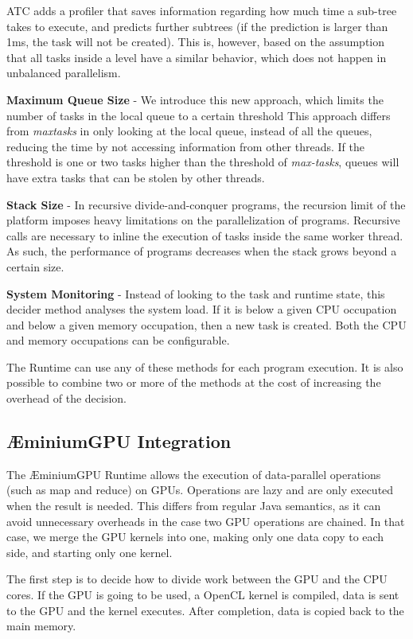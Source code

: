 \documentclass[smallextended]{svjour3}
\begin{document}
ATC adds a profiler that saves information regarding how much time a sub-tree takes to execute, and predicts further subtrees (if the prediction is larger than 1ms, the task will not be created). This is, however, based on the assumption that all tasks inside a level have a similar behavior, which does not happen in unbalanced parallelism.

\textbf{Maximum Queue Size} - We introduce this new approach, which limits the number of tasks in the local queue to a certain threshold This approach differs from \emph{maxtasks} in only looking at the local queue, instead of all the queues, reducing the time by not accessing information from other threads. If the threshold is one or two tasks higher than the threshold of \emph{max-tasks}, queues will have extra tasks that can be stolen by other threads.

\textbf{Stack Size} - In recursive divide-and-conquer programs, the recursion limit of the platform imposes heavy limitations on the parallelization of programs. Recursive calls are necessary to inline the execution of tasks inside the same worker thread. As such, the performance of programs decreases when the stack grows beyond a certain size.

\textbf{System Monitoring} - Instead of looking to the task and runtime state, this decider method analyses the system load. If it is below a given CPU occupation and below a given memory occupation, then a new task is created. Both the CPU and memory occupations can be configurable.


The Runtime can use any of these methods for each program execution. It is also possible to combine two or more of the methods at the cost of increasing the overhead of the decision.

\subsection{ÆminiumGPU Integration}

The ÆminiumGPU Runtime allows the execution of data-parallel operations (such as map and reduce) on GPUs. Operations are lazy and are only executed when the result is needed. This differs from regular Java semantics, as it can avoid unnecessary overheads in the case two GPU operations are chained. In that case, we merge the GPU kernels into one, making only one data copy to each side, and starting only one kernel.

The first step is to decide how to divide work between the GPU and the CPU cores. If the GPU is going to be used, a OpenCL kernel is compiled, data is sent to the GPU and the kernel executes. After completion, data is copied back to the main memory.
\end{document}

